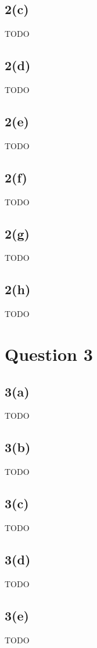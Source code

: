 \documentclass[10pt, a4paper,reqno]{article}
\begin{document}
\subsection*{2(c)}
TODO

\subsection*{2(d)}
TODO

\subsection*{2(e)}
TODO

\subsection*{2(f)}
TODO

\subsection*{2(g)}
TODO

\subsection*{2(h)}
TODO


%
%
\section*{Question 3}

\subsection*{3(a)}
TODO

\subsection*{3(b)}
TODO

\subsection*{3(c)}
TODO

\subsection*{3(d)}
TODO

\subsection*{3(e)}
TODO
\end{document}

